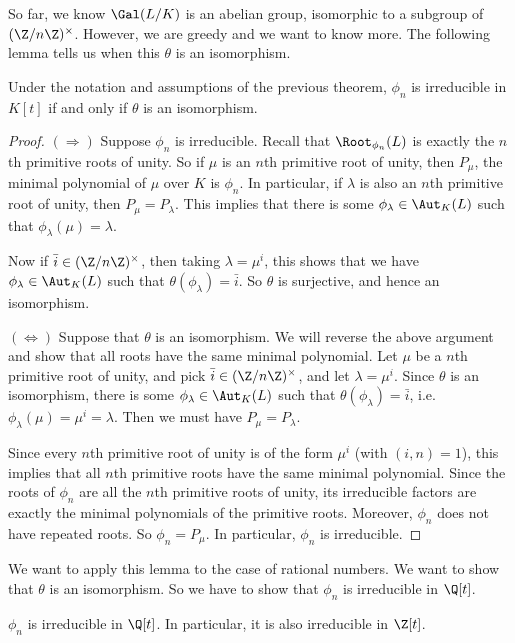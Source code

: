 \documentclass[a4paper]{article}
\begin{document}
So far, we know $\Gal(L/K)$ is an abelian group, isomorphic to a subgroup of $(\Z/n\Z)^\times$. However, we are greedy and we want to know more. The following lemma tells us when this $\theta$ is an isomorphism.

\begin{lemma}
  Under the notation and assumptions of the previous theorem, $\phi_n$ is irreducible in $K[t]$ if and only if $\theta$ is an isomorphism.
\end{lemma}

\begin{proof}
  $(\Rightarrow)$ Suppose $\phi_n$ is irreducible. Recall that $\Root_{\phi_n}(L)$ is exactly the $n$th primitive roots of unity. So if $\mu$ is an $n$th primitive root of unity, then $P_\mu$, the minimal polynomial of $\mu$ over $K$ is $\phi_n$. In particular, if $\lambda$ is also an $n$th primitive root of unity, then $P_\mu = P_\lambda$. This implies that there is some $\phi_\lambda \in \Aut_{K}(L)$ such that $\phi_\lambda(\mu) = \lambda$.

  Now if $\bar{i} \in (\Z/n\Z)^\times$, then taking $\lambda = \mu^i$, this shows that we have $\phi_\lambda \in \Aut_K(L)$ such that $\theta(\phi_\lambda) = \bar{i}$. So $\theta$ is surjective, and hence an isomorphism.

  $(\Leftrightarrow)$ Suppose that $\theta$ is an isomorphism. We will reverse the above argument and show that all roots have the same minimal polynomial. Let $\mu$ be a $n$th primitive root of unity, and pick $\bar{i} \in (\Z/n\Z)^\times$, and let $\lambda = \mu^i$. Since $\theta$ is an isomorphism, there is some $\phi_\lambda \in \Aut_K(L)$ such that $\theta(\phi_\lambda) = \bar{i}$, i.e.\ $\phi_\lambda(\mu) = \mu^i = \lambda$. Then we must have $P_\mu = P_\lambda$.

  Since every $n$th primitive root of unity is of the form $\mu^i$ (with $(i, n) = 1$), this implies that all $n$th primitive roots have the same minimal polynomial. Since the roots of $\phi_n$ are all the $n$th primitive roots of unity, its irreducible factors are exactly the minimal polynomials of the primitive roots. Moreover, $\phi_n$ does not have repeated roots. So $\phi_n = P_\mu$. In particular, $\phi_n$ is irreducible.
\end{proof}

We want to apply this lemma to the case of rational numbers. We want to show that $\theta$ is an isomorphism. So we have to show that $\phi_n$ is irreducible in $\Q[t]$.
\begin{thm}
  $\phi_n$ is irreducible in $\Q[t]$. In particular, it is also irreducible in $\Z[t]$.
\end{thm}
\end{document}
